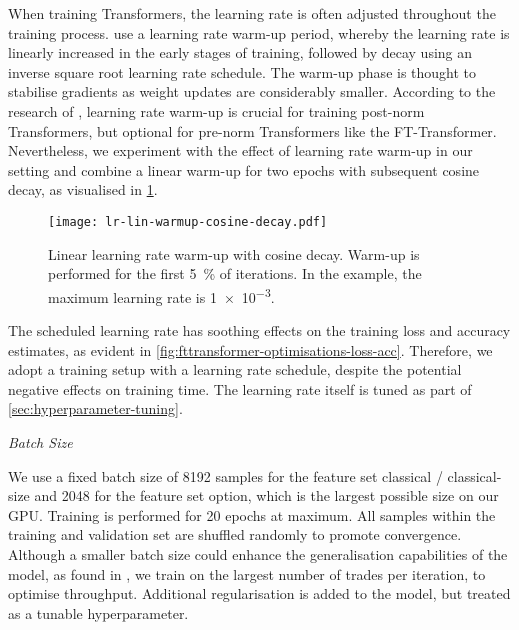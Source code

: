 When training Transformers, the learning rate is often adjusted throughout the training process. \textcite[][7]{vaswaniAttentionAllYou2017} use a learning rate warm-up period, whereby the learning rate is linearly increased in the early stages of training, followed by decay using an inverse square root learning rate schedule. The warm-up phase is thought to stabilise gradients as weight updates are considerably smaller. According to the research of \textcite[][3--4]{xiongLayerNormalizationTransformer2020}, learning rate warm-up is crucial for training post-norm Transformers, but optional for pre-norm Transformers like the FT-Transformer. Nevertheless, we experiment with the effect of learning rate warm-up in our setting and combine a linear warm-up for two epochs with subsequent cosine decay, as visualised in \cref{fig:lr-lin-warmup-cosine-decay}.

\begin{figure}[!ht]
    \centering
    \texttt{[image: lr-lin-warmup-cosine-decay.pdf]}
    \caption[Linear Learning Rate Warm-Up With Cosine Decay]{Linear learning rate warm-up with cosine decay. Warm-up is performed for the first \SI{5}{\percent} of iterations. In the example, the maximum learning rate is \num{1e-3}.}
    \label{fig:lr-lin-warmup-cosine-decay}
\end{figure}

The scheduled learning rate has soothing effects on the training loss and accuracy estimates, as evident in \cref{fig:fttransformer-optimisations-loss-acc}. Therefore, we adopt a training setup with a learning rate schedule, despite the potential negative effects on training time. The learning rate itself is tuned as part of \cref{sec:hyperparameter-tuning}.


\emph{Batch Size}

We use a fixed batch size of \num{8192} samples for the feature set classical / classical-size and \num{2048} for the feature set option, which is the largest possible size on our \gls{GPU}. Training is performed for \num{20} epochs at maximum. All samples within the training and validation set are shuffled randomly to promote convergence. Although a smaller batch size could enhance the generalisation capabilities of the model, as found in \textcite[][3]{keskarLargeBatchTrainingDeep2017}, we train on the largest number of trades per iteration, to optimise throughput. Additional regularisation is added to the model, but treated as a tunable hyperparameter.

